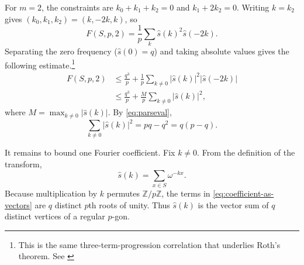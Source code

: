 \documentclass{article}
\begin{document}
For $m=2$, the constraints are
$k_0+k_1+k_2=0$ and $k_1+2k_2=0$. Writing $k=k_2$ gives
$(k_0,k_1,k_2)=(k,-2k,k)$, so
\begin{equation}
F(S,p,2)=\frac1p\sum_k
\widehat{s}(k)^2\widehat{s}(-2k).
\label{eq:three-ap-fourier}
\end{equation}
Separating the zero frequency ($\widehat{s}(0)=q$) and taking absolute values gives the following estimate.\footnote{This is the same three-term-progression correlation that underlies Roth's theorem. See \cite{zhao2019roth}}
\begin{align}
F(S,p,2)
&\leq \frac{q^3}{p}
 +\frac1p\sum_{k\neq0}
 |\widehat{s}(k)|^2|\widehat{s}(-2k)| \\
&\leq \frac{q^3}{p}
 +\frac{M}{p}\sum_{k\neq0}|\widehat{s}(k)|^2,
\label{eq:fourier-with-M}
\end{align}
where $M=\max_{k\neq0}|\widehat{s}(k)|$. By \eqref{eq:parseval},
\begin{equation}
\sum_{k\neq0}|\widehat{s}(k)|^2=pq-q^2=q(p-q).
\label{eq:nonzero-fourier-mass}
\end{equation}

It remains to bound one Fourier coefficient. Fix $k\neq0$. From the
definition of the transform,
\begin{equation}
\widehat{s}(k)=\sum_{x\in S}\omega^{-kx}.
\label{eq:coefficient-as-vectors}
\end{equation}
Because multiplication by $k$ permutes $\mathbb{Z}/p\mathbb{Z}$, the terms
in \eqref{eq:coefficient-as-vectors} are $q$ distinct $p$th roots of unity.
Thus $\widehat{s}(k)$ is the vector sum of $q$ distinct vertices of a regular
$p$-gon.
\end{document}
